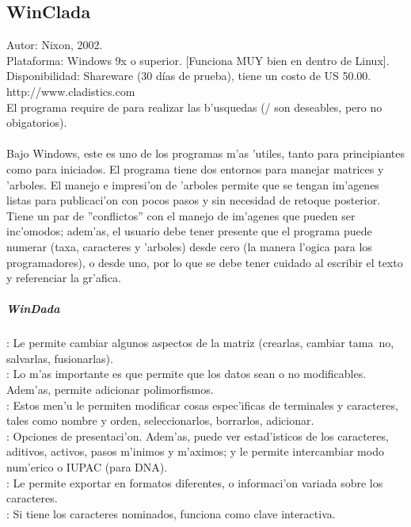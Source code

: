 \subsection{WinClada}
\noindent
Autor: Nixon, 2002.\\
Plataforma: Windows 9x o superior. [Funciona MUY bien en  dentro de Linux].\\
Disponibilidad: Shareware (30 d\'ias de prueba), tiene un costo de US 50.00.\\
http://www.cladistics.com
\\El programa require de  para realizar las b'usquedas (/ son deseables, pero no obigatorios).
\paragraph*{}
Bajo Windows, este es uno de los programas m'as 'utiles, tanto para principiantes como para iniciados. El programa tiene dos entornos para manejar matrices y 'arboles. El manejo e impresi'on de 'arboles permite que se tengan im'agenes listas para publicaci'on con pocos pasos y sin necesidad de retoque posterior. Tiene un par de ''conflictos'' con el manejo de im'agenes que pueden ser inc'omodos; adem'as, el usuario debe tener presente que el programa puede numerar (taxa, caracteres y 'arboles) desde cero (la manera l'ogica para los programadores), o desde uno, por lo que se debe tener cuidado al escribir el texto y referenciar la gr'afica.
\subparagraph*{WinDada}
: Le permite cambiar algunos aspectos de la matriz (crearlas, cambiar tama~no, salvarlas, fusionarlas).\\
: Lo m'as importante es que permite que los datos sean o no modificables. Adem'as, permite adicionar polimorfismos.\\
: Estos men'u le permiten modificar cosas espec'ificas de terminales y caracteres, tales como nombre y orden, seleccionarlos, borrarlos, adicionar.\\
: Opciones de presentaci'on. Adem'as, puede ver estad'isticos de los caracteres, aditivos, activos, pasos m'inimos y m'aximos; y le permite intercambiar modo num'erico o IUPAC (para DNA).\\
: Le permite exportar en formatos diferentes, o informaci'on variada sobre los caracteres.\\
: Si tiene los caracteres nominados, funciona como clave interactiva.\\
